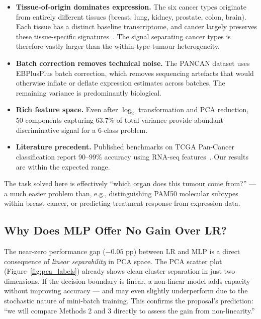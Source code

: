 \documentclass[11pt,letterpaper]{article}
\begin{document}
\begin{itemize}[leftmargin=2em,itemsep=2pt]
  \item \textbf{Tissue-of-origin dominates expression.}  The six cancer types
        originate from entirely different tissues (breast, lung, kidney,
        prostate, colon, brain).  Each tissue has a distinct baseline
        transcriptome, and cancer largely preserves these tissue-specific
        signatures~\cite{weinstein2013}.  The signal separating cancer types
        is therefore vastly larger than the within-type tumour heterogeneity.

  \item \textbf{Batch correction removes technical noise.}  The PANCAN dataset
        uses EBPlusPlus batch correction, which removes sequencing artefacts
        that would otherwise inflate or deflate expression estimates across
        batches.  The remaining variance is predominantly biological.

  \item \textbf{Rich feature space.}  Even after $\log_2$ transformation and
        PCA reduction, 50 components capturing 63.7\% of total variance
        provide abundant discriminative signal for a 6-class problem.

  \item \textbf{Literature precedent.}  Published benchmarks on TCGA Pan-Cancer
        classification report 90--99\% accuracy using RNA-seq
        features~\cite{weinstein2013,hutter2018}.  Our results are within the
        expected range.
\end{itemize}

The task solved here is effectively ``which organ does this tumour come from?''
--- a much easier problem than, e.g., distinguishing PAM50 molecular subtypes
within breast cancer, or predicting treatment response from expression data.

\subsection{Why Does MLP Offer No Gain Over LR?}

The near-zero performance gap ($-0.05$ pp) between LR and MLP is a direct
consequence of \emph{linear separability} in PCA space.  The PCA scatter plot
(Figure~\ref{fig:pca_labels}) already shows clean cluster separation in just
two dimensions.  If the decision boundary is linear, a non-linear model adds
capacity without improving accuracy --- and may even slightly underperform due
to the stochastic nature of mini-batch training.  This confirms the proposal's
prediction: ``we will compare Methods 2 and 3 directly to assess the gain from
non-linearity.''
\end{document}
